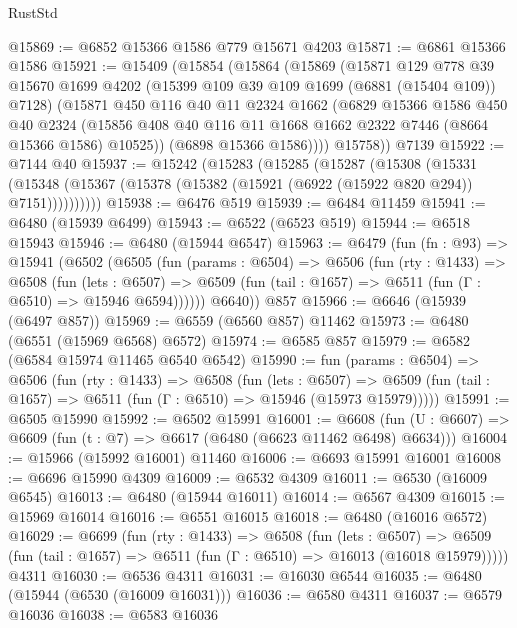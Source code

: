 \begin{lexlean}{RustStd}
\begin{coremodule}
@15869 := @6852 @15366 @1586 @779 @15671 @4203
@15871 := @6861 @15366 @1586
@15921 := @15409
    (@15854
      (@15864
        (@15869
          (@15871
            @129
            @778
            @39
            @15670
            @1699
            @4202
            (@15399 @109 @39 @109 @1699 (@6881 (@15404 @109)) @7128)
            (@15871
              @450
              @116
              @40
              @11
              @2324
              @1662
              (@6829
                @15366
                @1586
                @450
                @40
                @2324
                (@15856 @408 @40 @116 @11 @1668 @1662 @2322 @7446 (@8664 @15366 @1586) @10525))
              (@6898 @15366 @1586))))
        @15758))
    @7139
@15922 := @7144 @40
@15937 := @15242
    (@15283
      (@15285
        (@15287
          (@15308
            (@15331
              (@15348 (@15367 (@15378 (@15382 (@15921 (@6922 (@15922 @820 @294)) @7151))))))))))
@15938 := @6476 @519
@15939 := @6484 @11459
@15941 := @6480 (@15939 @6499)
@15943 := @6522 (@6523 @519)
@15944 := @6518 @15943
@15946 := @6480 (@15944 @6547)
@15963 := @6479
    (fun (fn : @93) =>
    @15941
      (@6502
        (@6505
          (fun (params : @6504) =>
          @6506
            (fun (rty : @1433) =>
            @6508
              (fun (lets : @6507) =>
              @6509 (fun (tail : @1657) => @6511 (fun (Γ : @6510) => @15946 @6594))))))
        @6640))
    @857
@15966 := @6646 (@15939 (@6497 @857))
@15969 := @6559 (@6560 @857) @11462
@15973 := @6480 (@6551 (@15969 @6568) @6572)
@15974 := @6585 @857
@15979 := @6582 (@6584 @15974 @11465 @6540 @6542)
@15990 := fun (params : @6504) =>
  @6506
    (fun (rty : @1433) =>
    @6508
      (fun (lets : @6507) =>
      @6509 (fun (tail : @1657) => @6511 (fun (Γ : @6510) => @15946 (@15973 @15979)))))
@15991 := @6505 @15990
@15992 := @6502 @15991
@16001 := @6608
    (fun (U : @6607) => @6609 (fun (t : @7) => @6617 (@6480 (@6623 @11462 @6498) @6634)))
@16004 := @15966 (@15992 @16001) @11460
@16006 := @6693 @15991 @16001
@16008 := @6696 @15990 @4309
@16009 := @6532 @4309
@16011 := @6530 (@16009 @6545)
@16013 := @6480 (@15944 @16011)
@16014 := @6567 @4309
@16015 := @15969 @16014
@16016 := @6551 @16015
@16018 := @6480 (@16016 @6572)
@16029 := @6699
    (fun (rty : @1433) =>
    @6508
      (fun (lets : @6507) =>
      @6509 (fun (tail : @1657) => @6511 (fun (Γ : @6510) => @16013 (@16018 @15979)))))
    @4311
@16030 := @6536 @4311
@16031 := @16030 @6544
@16035 := @6480 (@15944 (@6530 (@16009 @16031)))
@16036 := @6580 @4311
@16037 := @6579 @16036
@16038 := @6583 @16036

\end{coremodule}
\end{lexlean}
